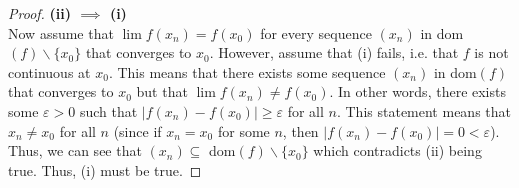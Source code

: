 \documentclass[10pt,a4paper]{article}
\theoremstyle{definition}
\begin{document}
\begin{proof}{\textbf{(ii) $\implies$ (i)}}
\\Now assume that $\lim f(x_n) = f(x_0)$ for every sequence $(x_n)$ in dom$(f) \backslash \{x_0\}$ that converges to $x_0$. However, assume that (i) fails, i.e. that $f$ is not continuous at $x_0$. This means that there exists some sequence $(x_n)$ in dom$(f)$ that converges to $x_0$ but that $\lim f(x_n) \neq f(x_0)$. In other words, there exists some $\varepsilon > 0$ such that $|f(x_n) - f(x_0)| \geq \varepsilon$ for all $n$. This statement means that $x_n \neq x_0$ for all $n$ (since if $x_n = x_0$ for some $n$, then $|f(x_n) - f(x_0)| = 0 < \varepsilon$). Thus, we can see that $(x_n) \subseteq $ dom$(f) \backslash \{x_0\}$ which contradicts (ii) being true. Thus, (i) must be true. 
\end{proof}
\end{document}
